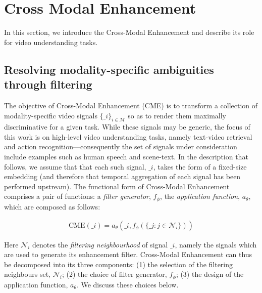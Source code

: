 \section{Cross Modal Enhancement}

In this section, we introduce the Cross-Modal Enhancement and describe its role for video understanding tasks.


\subsection{Resolving modality-specific ambiguities through filtering}

The objective of Cross-Modal Enhancement (CME) is to transform a collection of modality-specific video signals $\{\bm_i \}_{i \in \mathcal{M}}$ so as to render them maximally discriminative for a given task.  While these signals may be generic, the focus of this work is on high-level video understanding tasks, namely text-video retrieval and action recognition---consequently the set of signals under consideration include examples such as human speech and scene-text.  In the description that follows, we assume that that each such signal, $\bm_i$, takes the form of a fixed-size embedding (and therefore that temporal aggregation of each signal has been performed upstream).  The functional form of Cross-Modal Enhancement comprises a pair of functions: a \textit{filter generator}, $f_\phi$, the \textit{application function}, $a_\theta$, which are composed as follows:

\begin{align}
    \text{CME}(\bm_i) = a_\theta (\bm_i,  f_\phi (\{\bm_j: j \in \mathcal{N}_i\}))
    \label{eqn:cmf}
\end{align}

Here $\mathcal{N}_i$ denotes the \textit{filtering neighbourhood} of signal $\bm_i$, namely the signals which are used to generate its enhancement filter.  Cross-Modal Enhancement can thus be decomposed into its three components: (1) the selection of the filtering neighbours set, $\mathcal{N}_i$; (2) the choice of filter generator, $f_{\phi}$; (3) the design of the application function, $a_\theta$.  We discuss these choices below.

